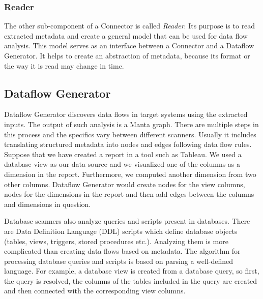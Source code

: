 \subsubsection{Reader}

The other sub-component of a Connector is called \textit{Reader}. Its purpose is to read extracted metadata and create a general model that can be used for data flow analysis. This model serves as an interface between a Connector and a Dataflow Generator. It helps to create an abstraction of metadata, because its format or the way it is read may change in time.

\subsection{Dataflow Generator}

Dataflow Generator discovers data flows in target systems using the extracted inputs. The output of such analysis is a Manta graph. There are multiple steps in this process and the specifics vary between different scanners. Usually it includes translating structured metadata into nodes and edges following data flow rules. Suppose that we have created a report in a tool such as Tableau. We used a database view as our data source and we visualized one of the columns as a dimension in the report. Furthermore, we computed another dimension from two other columns. Dataflow Generator would create nodes for the view columns, nodes for the dimensions in the report and then add edges between the columns and dimensions in question.
\par
Database scanners also analyze queries and scripts present in databases. There are Data Definition Language (DDL) scripts which define database objects (tables, views, triggers, stored procedures etc.). Analyzing them is more complicated than creating data flows based on metadata. The algorithm for processing database queries and scripts is based on parsing a well-defined language. For example, a database view is created from a database query, so first, the query is resolved, the columns of the tables included in the query are created and then connected with the corresponding view columns.

